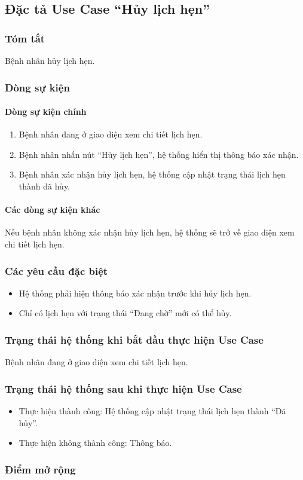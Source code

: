 \subsection{Đặc tả Use Case ``Hủy lịch hẹn''}

\subsubsection{Tóm tắt}
Bệnh nhân hủy lịch hẹn.

\subsubsection{Dòng sự kiện}
\paragraph{\textbf{Dòng sự kiện chính}}
\begin{enumerate}
  \item Bệnh nhân đang ở giao diện xem chi tiết lịch hẹn.
  \item Bệnh nhân nhấn nút ``Hủy lịch hẹn'', hệ thống hiển thị thông báo xác nhận.
  \item Bệnh nhân xác nhận hủy lịch hẹn, hệ thống cập nhật trạng thái lịch hẹn thành đã hủy.
\end{enumerate}

\paragraph{\textbf{Các dòng sự kiện khác}}
Nếu bệnh nhân không xác nhận hủy lịch hẹn, hệ thống sẽ trở về giao diện xem chi tiết lịch hẹn.

\subsubsection{Các yêu cầu đặc biệt}
\begin{itemize}
  \item Hệ thống phải hiện thông báo xác nhận trước khi hủy lịch hẹn.
  \item Chỉ có lịch hẹn với trạng thái ``Đang chờ'' mới có thể hủy.
\end{itemize}

\subsubsection{Trạng thái hệ thống khi bắt đầu thực hiện Use Case}
Bệnh nhân đang ở giao diện xem chi tiết lịch hẹn.

\subsubsection{Trạng thái hệ thống sau khi thực hiện Use Case}
\begin{itemize}
  \item Thực hiện thành công: Hệ thống cập nhật trạng thái lịch hẹn thành ``Đã hủy''.
  \item Thực hiện không thành công: Thông báo.
\end{itemize}

\subsubsection{Điểm mở rộng}